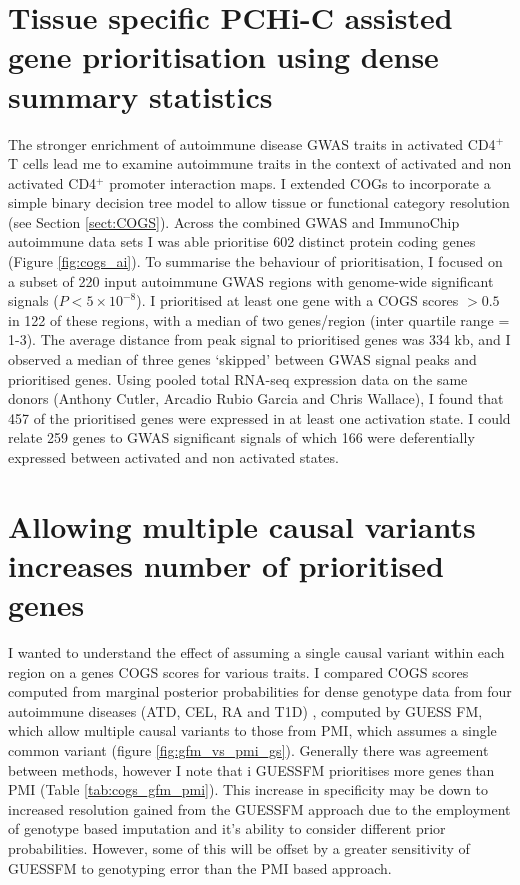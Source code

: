 \documentclass[a4paper,11pt]{report}
\begin{document}
\section{Tissue specific PCHi-C assisted gene prioritisation using dense summary statistics}
The stronger enrichment of autoimmune disease GWAS traits in activated CD4$^+$ T cells lead me to examine autoimmune traits in the context of activated and non activated CD4$^{+}$ promoter interaction maps. I extended COGs to  incorporate a simple binary decision tree model to allow tissue or functional category resolution (see Section \ref{sect:COGS}).  Across the combined GWAS and ImmunoChip autoimmune data sets I was able prioritise 602 distinct protein coding genes  (Figure \ref{fig:cogs_ai}). To summarise the behaviour of prioritisation, I focused on a subset of 220 input autoimmune GWAS regions with genome-wide significant signals ($P<5 \times 10^{-8}$). I prioritised at least one gene with a COGS scores $>0.5$ in 122 of these regions, with a median of two genes/region (inter quartile range = 1-3). The average distance from peak signal to prioritised genes was 334 kb, and I observed a median of three genes `skipped' between GWAS signal peaks and prioritised genes. Using pooled total RNA-seq expression data on the same donors (Anthony Cutler, Arcadio Rubio Garcia and Chris Wallace), I found that 457 of the prioritised genes were expressed in at least one activation state. I could relate 259 genes to GWAS significant signals of which 166 were deferentially expressed between activated and non activated states.

\section{Allowing multiple causal variants increases number of prioritised genes}
I wanted to understand the effect of assuming a single causal variant within each region on a genes COGS scores for various traits. I compared COGS scores computed from marginal posterior probabilities for dense genotype data from four autoimmune diseases (ATD, CEL, RA and T1D) , computed by GUESS FM, which allow multiple causal variants to those from PMI, which assumes a single common variant (figure \ref{fig:gfm_vs_pmi_gs}). Generally there was agreement between methods, however I note that i GUESSFM prioritises more genes than PMI (Table \ref{tab:cogs_gfm_pmi}). This increase in specificity may be down to increased resolution gained from the GUESSFM approach due to the employment of genotype based imputation and it's ability to consider different prior probabilities. However, some of this will be offset by a greater sensitivity of GUESSFM to genotyping error than the PMI based approach.
\end{document}
